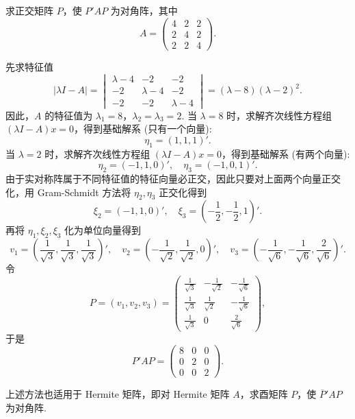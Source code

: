 \documentclass[../../main.tex]{subfiles}%
\begin{document}
\begin{example}
求正交矩阵 $P$，使 $P'AP$ 为对角阵，其中
\[
A = \begin{pmatrix}
4 & 2 & 2 \\
2 & 4 & 2 \\
2 & 2 & 4
\end{pmatrix}.
\]
\end{example}
\begin{solution}
先求特征值
\[
|\lambda I - A| = 
\begin{vmatrix}
\lambda - 4 & -2 & -2 \\
-2 & \lambda - 4 & -2 \\
-2 & -2 & \lambda - 4
\end{vmatrix}
= (\lambda - 8)(\lambda - 2)^2.
\]
因此，$A$ 的特征值为 $\lambda_1 = 8$，$\lambda_2 = \lambda_3 = 2$. 当 $\lambda = 8$ 时，求解齐次线性方程组 $(\lambda I - A)x = 0$，得到基础解系 (只有一个向量):
\[
\eta_1 = (1,1,1)'.
\]
当 $\lambda = 2$ 时，求解齐次线性方程组 $(\lambda I - A)x = 0$，得到基础解系 (有两个向量):
\[
\eta_2 = (-1,1,0)', \quad \eta_3 = (-1,0,1)'.
\]
由于实对称阵属于不同特征值的特征向量必正交，因此只要对上面两个向量正交化，用 Gram-Schmidt 方法将 $\eta_2,\eta_3$ 正交化得到
\[
\xi_2 = (-1,1,0)', \quad \xi_3 = (-\frac{1}{2},-\frac{1}{2},1)'.
\]
再将 $\eta_1,\xi_2,\xi_3$ 化为单位向量得到
\[
v_1 = (\frac{1}{\sqrt{3}},\frac{1}{\sqrt{3}},\frac{1}{\sqrt{3}})', \quad 
v_2 = (-\frac{1}{\sqrt{2}},\frac{1}{\sqrt{2}},0)', \quad 
v_3 = (-\frac{1}{\sqrt{6}},-\frac{1}{\sqrt{6}},\frac{2}{\sqrt{6}})'.
\]
令
\[
P = (v_1,v_2,v_3) = 
\begin{pmatrix}
\frac{1}{\sqrt{3}} & -\frac{1}{\sqrt{2}} & -\frac{1}{\sqrt{6}} \\
\frac{1}{\sqrt{3}} & \frac{1}{\sqrt{2}} & -\frac{1}{\sqrt{6}} \\
\frac{1}{\sqrt{3}} & 0 & \frac{2}{\sqrt{6}}
\end{pmatrix},
\]
于是
\[
P'AP = 
\begin{pmatrix}
8 & 0 & 0 \\
0 & 2 & 0 \\
0 & 0 & 2
\end{pmatrix}.
\]

\end{solution}
\begin{remark}
上述方法也适用于 Hermite 矩阵，即对 Hermite 矩阵 $A$，求酉矩阵 $P$，使 $\overline{P}'AP$ 为对角阵.
\end{remark}
\end{document}
